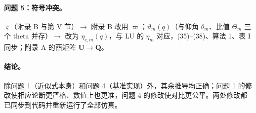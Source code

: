 \documentclass[11pt,a4paper]{ctexart}
\begin{document}
\paragraph{问题 5：符号冲突。}
$\varsigma$（附录 B 与第 V 节）$\to$ 附录 B 改用 $\varpi$；$\vartheta_m(q)$（与仰角 $\theta_m$、比值 $\Theta_m$ 三个 theta 并存）$\to$ 改为 $\eta_{e,m}(q)$，与 LU 的 $\eta_m$ 对应，(35)--(38)、算法 1、表 I 同步；附录 A 的酉矩阵 $\mathbf U\to\mathbf Q$。

\paragraph{结论。}
除问题 1（近似式本身）和问题 4（基准实现）外，其余推导均正确；问题 1 的修改使相应论断更严格、数值上也更准，问题 4 的修改使对比更公平。两处修改都已同步到代码并重新运行了全部仿真。

\end{document}

